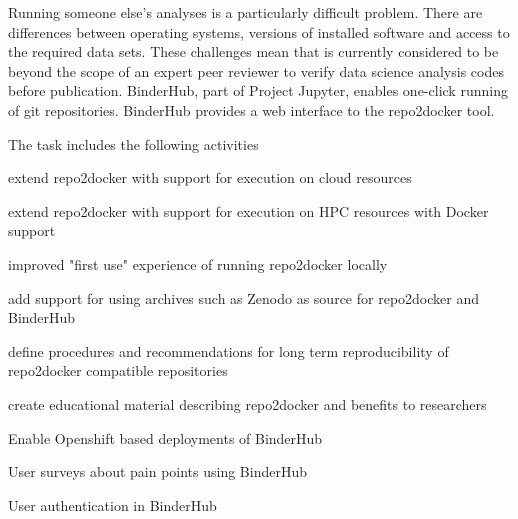 \begin{task}[
  title=Further development of repo2docker and Binder,
  id=r2d-and-binder,
  lead=SRL,
  PM=36,
  wphases={0-48},
  partners={WTT,XFEL}
]
  Running someone else's analyses is a particularly difficult problem.
  There are differences between operating systems, versions of installed software and access to the required data sets.
  These challenges mean that is currently considered to be beyond the scope of an expert peer reviewer to verify data science analysis codes before publication.
  BinderHub, part of Project Jupyter, enables one-click running of git repositories.
  BinderHub provides a web interface to the repo2docker tool.

  The task includes the following activities
  \begin{compactitem}
  \item extend repo2docker with support for execution on cloud resources
  \item extend repo2docker with support for execution on HPC resources with Docker support
  \item improved "first use" experience of running repo2docker locally
  \item add support for using archives such as Zenodo as source for repo2docker and BinderHub
  \item define procedures and recommendations for long term reproducibility of repo2docker compatible repositories
  \item create educational material describing repo2docker and benefits to researchers
  \item Enable Openshift based deployments of BinderHub
  \item User surveys about pain points using BinderHub
  \item User authentication in BinderHub
  \end{compactitem}
\end{task}
